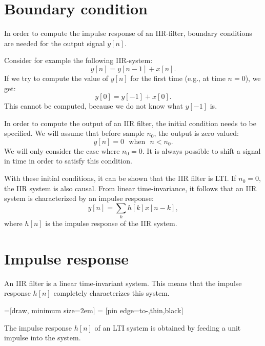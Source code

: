 \section{Boundary condition}

In order to compute the impulse response of an IIR-filter, boundary
conditions are needed for the output signal $y[n]$.

Consider for example the following IIR-system:
\begin{equation}
y[n] = y[n-1] + x[n].
\end{equation}
If we try to compute the value of $y[n]$ for the first time (e.g., at time $n=0$), we get:
\begin{equation}
y[0] = y[-1] + x[0].
\end{equation}
This cannot be computed, because we do not know what $y[-1]$ is. 

In order to compute the output of an IIR filter, the initial condition
needs to be specified. We will assume that before sample $n_0$, the
output is zero valued:
\begin{equation}
y[n] = 0 ~~~ \mathrm{when}  ~~~n<n_0.
\end{equation}
We will only consider the case where $n_0=0$. It is always possible to
shift a signal in time in order to satisfy this condition.

With these initial conditions, it can be shown that the IIR filter is
LTI. If $n_0=0$, the IIR system is also causal. From linear
time-invariance, it follows that an IIR system is characterized by an
impulse response:
\begin{equation}
y[n] = \sum_{k} h[k]x[n-k],
\end{equation}
where $h[n]$ is the impulse response of the IIR system.
\fi

\section{Impulse response}

An IIR filter is a linear time-invariant system. This means that the
impulse response $h[n]$ completely characterizes this system. 

=[draw, minimum size=2em]
 = [pin edge={to-,thin,black}]

\begin{marginfigure}
\begin{center}
\end{center}
\caption{The impulse response $h[n]$ of an LTI system is obtained by feeding a unit impulse into the system.}
\end{marginfigure}


